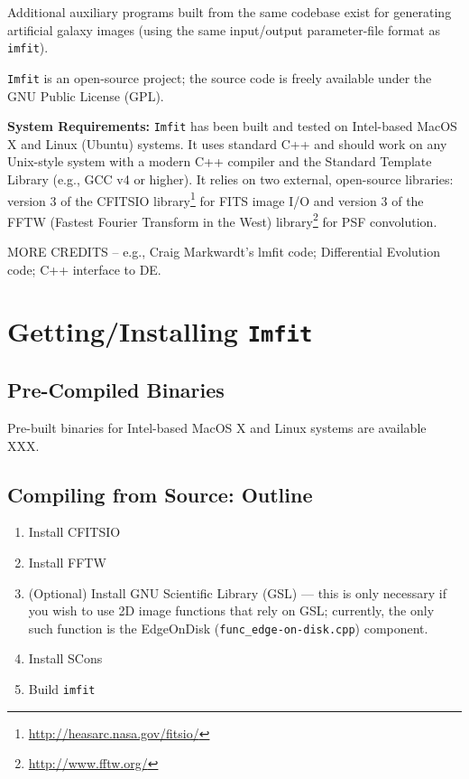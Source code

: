 \documentclass[10pt]{article}
\newcommand{\imfit}{\texttt{imfit}}
\newcommand{\Imfit}{\texttt{Imfit}}
\begin{document}
Additional auxiliary programs built from the same codebase exist for
generating artificial galaxy images (using the same input/output
parameter-file format as \imfit{}).

\Imfit{} is an open-source project; the source code is freely available
under the GNU Public License (GPL).


\bigskip

\textbf{System Requirements:} \Imfit{} has been built and tested on
Intel-based MacOS X and Linux (Ubuntu) systems. It uses standard C++ and
should work on any Unix-style system with a modern C++ compiler and the
Standard Template Library (e.g., GCC v4 or higher). It relies on two
external, open-source libraries: version 3 of the CFITSIO
library\footnote{\url{http://heasarc.nasa.gov/fitsio/}} for FITS image I/O and
version 3 of the FFTW (Fastest Fourier Transform in the West)
library\footnote{\url{http://www.fftw.org/}} for PSF convolution.

MORE CREDITS -- e.g., Craig Markwardt's lmfit code; Differential Evolution
code; C++ interface to DE.



\section{Getting/Installing \Imfit{}}

\subsection{Pre-Compiled Binaries}

Pre-built binaries for Intel-based MacOS X and Linux systems are available XXX.


\subsection{Compiling from Source: Outline}

\begin{enumerate}
\item Install CFITSIO

\item Install FFTW

\item (Optional) Install GNU Scientific Library (GSL) --- this is only necessary
if you wish to use 2D image functions that rely on GSL; currently, the only
such function is the EdgeOnDisk (\texttt{func\_edge-on-disk.cpp}) component.

\item Install SCons

\item Build \imfit{}

\end{enumerate}
\end{document}
